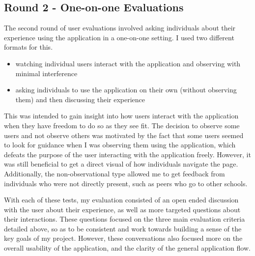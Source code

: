 \documentclass[10pt,twocolumn]{article}
\begin{document}
\subsection{Round 2 - One-on-one Evaluations}

The second round of user evaluations involved asking individuals about their experience using the application in a one-on-one 
setting. I used two different formats for this. 
\begin{itemize}
    \item watching individual users interact with the application and observing with minimal interference
    \item asking individuals to use the application on their own (without observing them) and then discussing their experience
\end{itemize}

This was intended to gain insight into how users interact with the application when they have freedom to do 
so as they see fit. The decision to observe some users and not observe others was motivated by the fact that some users 
seemed to look for guidance when I was observing them using the application, which defeats the purpose of the user interacting 
with the application freely. However, it was still beneficial to get a direct visual of how individuals navigate the page.
Additionally, the non-observational type allowed me to get feedback from individuals who were not directly present, such as 
peers who go to other schools.

With each of these tests, my evaluation consisted of an open ended discussion with the user about their experience, as 
well as more targeted questions about their interactions. These questions focused on the three main evaluation criteria 
detailed above, so as to be consistent and work towards building a sense of the key goals of my project. However, these 
conversations also focused more on the overall usability of the application, and the clarity of the general application 
flow.


\end{document}
